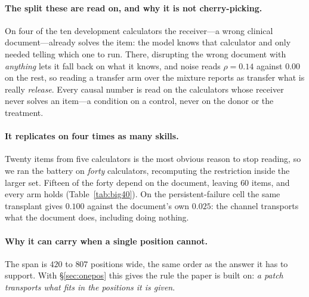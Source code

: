 \documentclass{article}
\begin{document}
\paragraph{The split these are read on, and why it is not cherry-picking.} On
four of the ten development calculators the receiver---a wrong clinical
document---already solves the item: the model knows that calculator and only
needed telling which one to run. There, disrupting the wrong document with
\emph{anything} lets it fall back on what it knows, and noise reads
$\rho = 0.14$ against $0.00$ on the rest, so reading a transfer arm over the
mixture reports as transfer what is really \emph{release}. Every causal number
is read on the calculators whose receiver never solves an item---a condition on
a control, never on the donor or the treatment.

\paragraph{It replicates on four times as many skills.} Twenty items from five
calculators is the most obvious reason to stop reading, so we ran the battery on
\emph{forty} calculators, recomputing the restriction inside the larger set.
Fifteen of the forty depend on the document, leaving $60$ items, and every arm
holds (Table~\ref{tab:big40}). On the persistent-failure cell the same
transplant gives $0.100$ against the document's own $0.025$: the channel
transports what the document does, including doing nothing.

\begin{table}[t]
\caption{The span battery on forty calculators. The restricted split---the
fifteen calculators a wrong document never rescues---is recomputed inside this
set, so no number is inherited from the ten-calculator version. Intervals are
bootstrapped over calculators. The last two rows are the instrument: writing the
receiver's own states back into it, and not patching at all.}
\label{tab:big40}
\centering
\small

\end{table}

\paragraph{Why it can carry when a single position cannot.} The span is $420$ to
$807$ positions wide, the same order as the answer it has to support. With
\S\ref{sec:onepos} this gives the rule the paper is built on: \emph{a patch
transports what fits in the positions it is given}.
\end{document}

